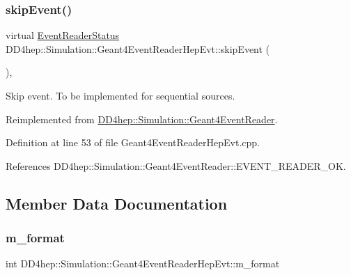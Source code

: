 \subsubsection{\texorpdfstring{skip\+Event()}{skipEvent()}}
{\footnotesize\ttfamily virtual \hyperlink{class_d_d4hep_1_1_simulation_1_1_geant4_event_reader_ae4f4bc83ffcf5b0c1868ad78859851e7}{Event\+Reader\+Status} D\+D4hep\+::\+Simulation\+::\+Geant4\+Event\+Reader\+Hep\+Evt\+::skip\+Event (\begin{DoxyParamCaption}{ }\end{DoxyParamCaption})\hspace{0.3cm}{\ttfamily [inline]}, {\ttfamily [virtual]}}



Skip event. To be implemented for sequential sources. 



Reimplemented from \hyperlink{class_d_d4hep_1_1_simulation_1_1_geant4_event_reader_a9381626ad4f4fa20e304414f6654ee03}{D\+D4hep\+::\+Simulation\+::\+Geant4\+Event\+Reader}.



Definition at line 53 of file Geant4\+Event\+Reader\+Hep\+Evt.\+cpp.



References D\+D4hep\+::\+Simulation\+::\+Geant4\+Event\+Reader\+::\+E\+V\+E\+N\+T\+\_\+\+R\+E\+A\+D\+E\+R\+\_\+\+OK.



\subsection{Member Data Documentation}
\hypertarget{class_d_d4hep_1_1_simulation_1_1_geant4_event_reader_hep_evt_a7d4105611f4277b52394d78aae4de38e}{}\label{class_d_d4hep_1_1_simulation_1_1_geant4_event_reader_hep_evt_a7d4105611f4277b52394d78aae4de38e} 
\subsubsection{\texorpdfstring{m\+\_\+format}{m\_format}}
{\footnotesize\ttfamily int D\+D4hep\+::\+Simulation\+::\+Geant4\+Event\+Reader\+Hep\+Evt\+::m\+\_\+format\hspace{0.3cm}{\ttfamily [protected]}}



